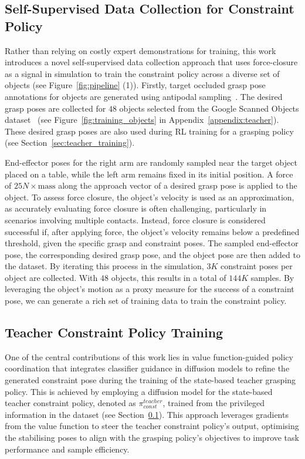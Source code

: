     


\subsection{Self-Supervised Data Collection for Constraint Policy}
\label{sec:data_collection}

Rather than relying on costly expert demonstrations for training, this work introduces a novel self-supervised data collection approach that uses force-closure as a signal in simulation to train the constraint policy across a diverse set of objects (see Figure~\ref{fig:pipeline} (1)).
Firstly, target occluded grasp pose annotations for objects are generated using antipodal sampling~\cite{eppner2019billion}.
The desired grasp poses are collected for $48$ objects selected from the Google Scanned Objects dataset~\cite{downs2022googlescannedobjectshighquality} (see Figure~\ref{fig:training_objects} in Appendix~\ref{appendix:teacher}).
These desired grasp poses are also used during RL training for a grasping policy (see Section~\ref{sec:teacher_training}).

End-effector poses for the right arm are randomly sampled near the target object placed on a table, while the left arm remains fixed in its initial position.
A force of $25N \times \text{mass}$ along the approach vector of a desired grasp pose is applied to the object.
To assess force closure, the object's velocity is used as an approximation, as accurately evaluating force closure is often challenging, particularly in scenarios involving multiple contacts.
Instead, force closure is considered successful if, after applying force, the object's velocity remains below a predefined threshold, given the specific grasp and constraint poses.
The sampled end-effector pose, the corresponding desired grasp pose, and the object pose are then added to the dataset. 
By iterating this process in the simulation, $3K$ constraint poses per object are collected.
With $48$ objects, this results in a total of $144K$ samples.
By leveraging the object's motion as a proxy measure for the success of a constraint pose, we can generate a rich set of training data to train the constraint policy.


\subsection{Teacher Constraint Policy Training }
\label{sec:pretraining}
One of the central contributions of this work lies in value function-guided policy coordination that integrates classifier guidance in diffusion models to refine the generated constraint pose during the training of the state-based teacher grasping policy. 
This is achieved by employing a diffusion model for the state-based teacher constraint policy, denoted as $\pi^{teacher}_{const}$, trained from the privileged information in the dataset (see Section~\ref{sec:data_collection}).
This approach leverages gradients from the value function to steer the teacher constraint policy's output, optimising the stabilising poses to align with the grasping policy's objectives to improve task performance and sample efficiency.


